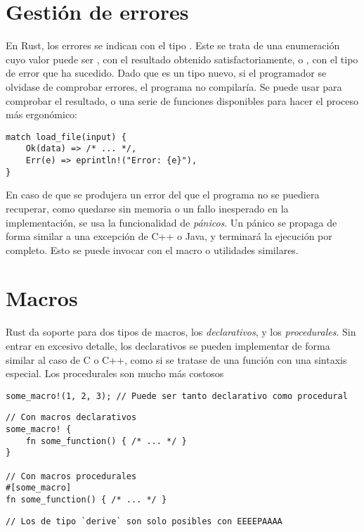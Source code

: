 \section{Gestión de errores}

En Rust, los errores se indican con el tipo . Este se trata
de una enumeración cuyo valor puede ser , con el resultado obtenido
satisfactoriamente, o , con el tipo de error que ha sucedido. Dado
que es un tipo nuevo, si el programador se olvidase de comprobar errores, el
programa no compilaría. Se puede usar  para comprobar el resultado,
o una serie de funciones disponibles para hacer el proceso más ergonómico:

\begin{verbatim}
match load_file(input) {
    Ok(data) => /* ... */,
    Err(e) => eprintln!("Error: {e}"),
}
\end{verbatim}

En caso de que se produjera un error del que el programa no se puediera
recuperar, como quedarse sin memoria o un fallo inesperado en la implementación,
se usa la funcionalidad de \emph{pánicos}. Un pánico se propaga de forma similar
a una excepción de C++ o Java, y terminará la ejecución por completo. Esto se
puede invocar con el macro  o utilidades similares.

\section{Macros}

Rust da soporte para dos tipos de macros, los \emph{declarativos}, y los
\emph{procedurales}. Sin entrar en excesivo detalle, los declarativos se pueden
implementar de forma similar al caso de C o C++, como si se tratase de una
función con una sintaxis especial. Los procedurales son mucho más costosos

\begin{verbatim}
some_macro!(1, 2, 3); // Puede ser tanto declarativo como procedural
\end{verbatim}

\begin{verbatim}
// Con macros declarativos
some_macro! {
    fn some_function() { /* ... */ }
}

// Con macros procedurales
#[some_macro]
fn some_function() { /* ... */ }
\end{verbatim}

\begin{verbatim}
// Los de tipo `derive` son solo posibles con EEEEPAAAA
\end{verbatim}
